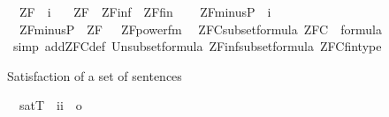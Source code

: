 \begin{isabellebody}
\isanewline
{}\isamarkupfalse%
\isanewline
\ \ ZF\ {\isacharcolon}{\kern0pt}{\isacharcolon}{\kern0pt}\ {\isachardoublequoteopen}i{\isachardoublequoteclose}\ \isanewline
\ \ {\isachardoublequoteopen}ZF\ {\isasymequiv}\ ZF{\isacharunderscore}{\kern0pt}inf\ {\isasymunion}\ ZF{\isacharunderscore}{\kern0pt}fin{\isachardoublequoteclose}\isanewline
\isanewline
{}\isamarkupfalse%
\ \isanewline
\ \ ZF{\isacharunderscore}{\kern0pt}minus{\isacharunderscore}{\kern0pt}P\ {\isacharcolon}{\kern0pt}{\isacharcolon}{\kern0pt}\ {\isachardoublequoteopen}i{\isachardoublequoteclose}\ \isanewline
\ \ {\isachardoublequoteopen}ZF{\isacharunderscore}{\kern0pt}minus{\isacharunderscore}{\kern0pt}P\ {\isasymequiv}\ ZF\ {\isacharminus}{\kern0pt}\ {\isacharbraceleft}{\kern0pt}\ ZF{\isacharunderscore}{\kern0pt}power{\isacharunderscore}{\kern0pt}fm\ {\isacharbraceright}{\kern0pt}{\isachardoublequoteclose}\isanewline
\isanewline
{}\isamarkupfalse%
\ ZFC{\isacharunderscore}{\kern0pt}subset{\isacharunderscore}{\kern0pt}formula{\isacharcolon}{\kern0pt}\ {\isachardoublequoteopen}ZFC\ {\isasymsubseteq}\ formula{\isachardoublequoteclose}\isanewline
%
\isadelimproof
\ \ %
\endisadelimproof
%
\isatagproof
{}\isamarkupfalse%
\ {\isacharparenleft}{\kern0pt}simp\ add{\isacharcolon}{\kern0pt}ZFC{\isacharunderscore}{\kern0pt}def\ Un{\isacharunderscore}{\kern0pt}subset{\isacharunderscore}{\kern0pt}formula\ ZF{\isacharunderscore}{\kern0pt}inf{\isacharunderscore}{\kern0pt}subset{\isacharunderscore}{\kern0pt}formula\ ZFC{\isacharunderscore}{\kern0pt}fin{\isacharunderscore}{\kern0pt}type{\isacharparenright}{\kern0pt}%
\endisatagproof
{\isafoldproof}%
%
\isadelimproof
%
\endisadelimproof
%
\begin{isamarkuptxt}%
Satisfaction of a set of sentences%
\end{isamarkuptxt}\isamarkuptrue%
\isamarkupfalse%
\isanewline
\ \ satT\ {\isacharcolon}{\kern0pt}{\isacharcolon}{\kern0pt}\ {\isachardoublequoteopen}{\isacharbrackleft}{\kern0pt}i{\isacharcomma}{\kern0pt}i{\isacharbrackright}{\kern0pt}\ {\isasymRightarrow}\ o{\isachardoublequoteclose}\ \ {\isacharparenleft}{\kern0pt}{\isachardoublequoteopen}{\isacharunderscore}{\kern0pt}\ {\isasymTurnstile}\ {\isacharunderscore}{\kern0pt}{\isachardoublequoteclose}\ {\isacharbrackleft}{\kern0pt}{}{}{\isacharcomma}{\kern0pt}{}{}{\isacharbrackright}{\kern0pt}\ {}{}{\isacharparenright}{\kern0pt}\ \isanewline

\end{isabellebody}
